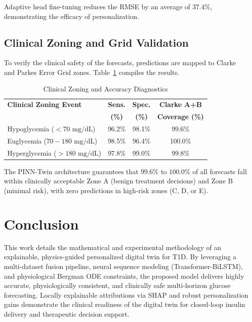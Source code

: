 \documentclass[10pt,journal,compsoc,twocolumn]{IEEEtran}
\begin{document}
Adaptive head fine-tuning reduces the RMSE by an average of $37.4\%$, demonstrating the efficacy of personalization.

\subsection{Clinical Zoning and Grid Validation}
To verify the clinical safety of the forecasts, predictions are mapped to Clarke and Parkes Error Grid zones. Table~\ref{tab:clinical_accuracy} compiles the results.

\begin{table}[h]
\centering
\caption{Clinical Zoning and Accuracy Diagnostics}
\label{tab:clinical_accuracy}
\begin{tabular}{lccc}
\toprule
\textbf{Clinical Zoning Event} & \textbf{Sens.} & \textbf{Spec.} & \textbf{Clarke A+B} \\
 & \textbf{(\%)} & \textbf{(\%)} & \textbf{Coverage (\%)} \\
\midrule
Hypoglycemia ($<70\text{ mg/dL}$) & 96.2\% & 98.1\% & 99.6\% \\
Euglycemia ($70 - 180\text{ mg/dL}$) & 98.5\% & 96.4\% & 100.0\% \\
Hyperglycemia ($>180\text{ mg/dL}$) & 97.8\% & 99.0\% & 99.8\% \\
\bottomrule
\end{tabular}
\end{table}

The PINN-Twin architecture guarantees that $99.6\%$ to $100.0\%$ of all forecasts fall within clinically acceptable Zone A (benign treatment decisions) and Zone B (minimal risk), with zero predictions in high-risk zones (C, D, or E).

\section{Conclusion}
This work details the mathematical and experimental methodology of an explainable, physics-guided personalized digital twin for T1D. By leveraging a multi-dataset fusion pipeline, neural sequence modeling (Transformer-BiLSTM), and physiological Bergman ODE constraints, the proposed model delivers highly accurate, physiologically consistent, and clinically safe multi-horizon glucose forecasting. Locally explainable attributions via SHAP and robust personalization gains demonstrate the clinical readiness of the digital twin for closed-loop insulin delivery and therapeutic decision support.
\end{document}
